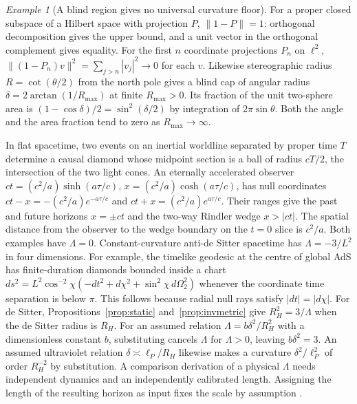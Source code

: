 \documentclass[aps,pra,onecolumn,superscriptaddress,nofootinbib,10pt]{revtex4-2}
\theoremstyle{definition}
\theoremstyle{remark}
\newtheorem{example}[theorem]{Example}
\begin{document}
\begin{example}[A blind region gives no universal curvature floor]\label{ob:curvature}
For a proper closed subspace of a Hilbert space with projection \(P\),
\(\lVert1-P\rVert=1\): orthogonal decomposition gives the upper bound,
and a unit vector in the orthogonal complement gives equality.
For the first \(n\) coordinate projections \(P_n\) on \(\ell^2\),
\(\|(1-P_n)v\|^2=\sum_{j>n}|v_j|^2\to0\) for each \(v\).
Likewise stereographic radius \(R=\cot(\theta/2)\) from the
north pole gives a blind cap of angular radius
\(\delta=2\arctan(1/R_{\max})\) at finite \(R_{\max}>0\).
Its fraction of the unit two-sphere area is
\((1-\cos\delta)/2=\sin^2(\delta/2)\) by integration of
\(2\pi\sin\theta\). Both the angle and the area fraction tend to
zero as \(R_{\max}\to\infty\).

In flat spacetime, two events on an inertial worldline separated by
proper time \(T\) determine a causal diamond whose midpoint section
is a ball of radius \(cT/2\), the intersection of the two light cones.
An eternally accelerated observer \(ct=(c^2/a)\sinh(a\tau/c)\),
\(x=(c^2/a)\cosh(a\tau/c)\), has null coordinates
\(ct-x=-(c^2/a)e^{-a\tau/c}\) and
\(ct+x=(c^2/a)e^{a\tau/c}\). Their ranges give the past and future
horizons \(x=\pm ct\) and the two-way Rindler wedge \(x>|ct|\).
The spatial distance from the observer to the wedge boundary
on the \(t=0\) slice is \(c^2/a\). Both examples have \(\Lambda=0\). Constant-curvature
anti-de Sitter spacetime has \(\Lambda=-3/L^2\) in four dimensions.
For example, the timelike geodesic at the centre of global AdS
has finite-duration diamonds bounded inside a chart
\(ds^2=L^2\cos^{-2}\chi(-dt^2+d\chi^2+\sin^2\chi\,d\Omega_2^2)\)
whenever the coordinate time separation is below \(\pi\).
This follows because radial null rays satisfy \(|dt|=|d\chi|\).
For de Sitter, Propositions~\ref{prop:static} and~\ref{prop:invmetric}
give \(R_H^2=3/\Lambda\) when the de Sitter
radius is \(R_H\). For an assumed relation
\(\Lambda=b\delta^2/R_H^2\) with a dimensionless constant \(b\), substituting cancels \(\Lambda\) for \(\Lambda>0\),
leaving \(b\delta^2=3\). An assumed ultraviolet relation
\(\delta\asymp\ell_P/R_H\) likewise makes a curvature
\(\delta^2/\ell_P^2\) of order \(R_H^{-2}\) by substitution.
A comparison derivation of a physical \(\Lambda\) needs
independent dynamics and an independently calibrated length. Assigning the length of the resulting horizon
as input fixes the scale by assumption
\cite{GibbonsHawking,obr:weinberg}.
\end{example}
\end{document}
